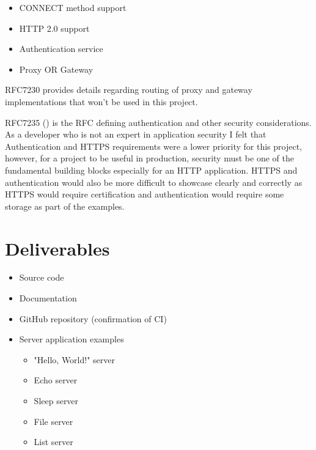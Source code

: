 \documentclass[12pt, a4paper]{article}
\begin{document}
\begin{itemize}
    \item\label{wreq:connect-method-support} CONNECT method support
    \item\label{wreq:http2.0-support} HTTP 2.0 support
    \item\label{wreq:authentication} Authentication service
    \item\label{wreq:proxy-or-gateway} Proxy OR Gateway
\end{itemize}

RFC7230 provides details regarding routing of proxy and gateway implementations that
won't be used in this project.

RFC7235 (\cite{rfc7235}) is the RFC defining authentication and other security considerations. As
a developer who is not an expert in application security I felt that Authentication and HTTPS
requirements were a lower priority for this project, however, for a project to be useful in production,
security must be one of the fundamental building blocks especially for an HTTP application. HTTPS and
authentication would also be more difficult to showcase clearly and correctly as HTTPS would require
certification and authentication would require some storage as part of the examples.

\section{Deliverables} \label{sec:deliverables}

\begin{itemize}
    \item Source code 
    \item Documentation
    \item GitHub repository (confirmation of CI)
    \item Server application examples \footnotemark[1]
      \begin{itemize}
          \item "Hello, World!" server
          \item Echo server 
          \item Sleep server 
          \item File server
          \item List server
      \end{itemize}
\end{itemize}

\end{document}
